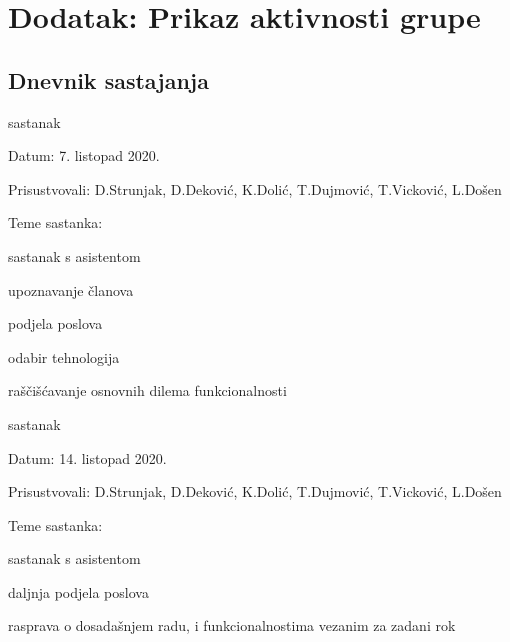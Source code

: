 \chapter*{Dodatak: Prikaz aktivnosti grupe}
		
		\section*{Dnevnik sastajanja}
		

		
		\begin{packed_enum}
			\item  sastanak
			\item[] \begin{packed_item}
				\item Datum: 7. listopad 2020. 
				\item Prisustvovali: D.Strunjak, D.Deković, K.Dolić, T.Dujmović, T.Vicković, L.Došen
				\item Teme sastanka:
				\begin{packed_item}
					\item sastanak s asistentom
					\item upoznavanje članova
					\item podjela poslova
					\item odabir tehnologija
					\item raščišćavanje osnovnih dilema funkcionalnosti
				\end{packed_item}
			\end{packed_item}
		
			\item  sastanak
			\item[] \begin{packed_item}
				\item Datum: 14. listopad 2020. 
				\item Prisustvovali: D.Strunjak, D.Deković, K.Dolić, T.Dujmović, T.Vicković, L.Došen
				\item Teme sastanka:
				\begin{packed_item}
					\item sastanak s asistentom
					\item daljnja podjela poslova
					\item rasprava o dosadašnjem radu, i funkcionalnostima vezanim za zadani rok
				\end{packed_item}
			\end{packed_item}
		

\end{packed_enum}
